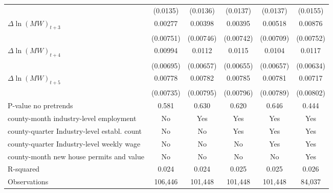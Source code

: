 {\begin{tabular}{l*{5}{c}}
          & (0.0135)         & (0.0136)         & (0.0137)         & (0.0137)         & (0.0155)         \\
[1em]
$\Delta \ln(MW)_{t+3}$&  0.00277         &  0.00398         &  0.00395         &  0.00518         &  0.00876         \\
          &(0.00751)         &(0.00746)         &(0.00742)         &(0.00709)         &(0.00752)         \\
[1em]
$\Delta \ln(MW)_{t+4}$&  0.00994         &   0.0112\sym{*}  &   0.0115\sym{*}  &   0.0104         &   0.0117\sym{*}  \\
          &(0.00695)         &(0.00657)         &(0.00655)         &(0.00657)         &(0.00634)         \\
[1em]
$\Delta \ln(MW)_{t+5}$&  0.00778         &  0.00782         &  0.00785         &  0.00781         &  0.00717         \\
          &(0.00735)         &(0.00795)         &(0.00796)         &(0.00789)         &(0.00802)         \\
\hline
P-value no pretrends&    0.581         &    0.630         &    0.620         &    0.646         &    0.444         \\
county-month industry-level employment&       No         &      Yes         &      Yes         &      Yes         &      Yes         \\
county-quarter Industry-level establ. count&       No         &       No         &      Yes         &      Yes         &      Yes         \\
county-quarter Industry-level weekly wage&       No         &       No         &       No         &      Yes         &      Yes         \\
county-month new house permits and value&       No         &       No         &       No         &       No         &      Yes         \\
R-squared &    0.024         &    0.024         &    0.025         &    0.025         &    0.026         \\
Observations&  106,446         &  101,448         &  101,448         &  101,448         &   84,037         \\
\hline\hline
\end{tabular}
}
